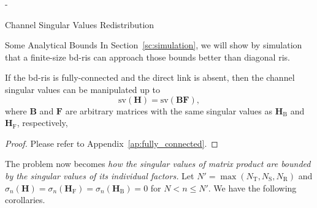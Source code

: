 \begin{section}{-}
\begin{subsection}{Channel Singular Values Redistribution}
\begin{subsubsection}{Some Analytical Bounds}
			In Section~\ref{sc:simulation}, we will show by simulation that a finite-size \gls{bd}-\gls{ris} can approach those bounds better than diagonal \gls{ris}.

			\begin{proposition}\label{pp:fully_connected}
				If the \gls{bd}-\gls{ris} is fully-connected and the direct link is absent, then the channel singular values can be manipulated up to
				\begin{equation}
					\mathrm{sv}(\mathbf{H}) = \mathrm{sv}(\mathbf{BF}),
				\end{equation}
				where $\mathbf{B}$ and $\mathbf{F}$ are arbitrary matrices with the same singular values as $\mathbf{H}_\mathrm{B}$ and $\mathbf{H}_\mathrm{F}$, respectively,
			\end{proposition}

			\begin{proof}
				Please refer to Appendix~\ref{ap:fully_connected}.
			\end{proof}

			The problem now becomes \emph{how the singular values of matrix product are bounded by the singular values of its individual factors.}
			Let $N' = \max(N_\mathrm{T},N_\mathrm{S},N_\mathrm{R})$ and $\sigma_n(\mathbf{H})=\sigma_n(\mathbf{H}_\mathrm{F})=\sigma_n(\mathbf{H}_\mathrm{B})=0$ for $N < n \le N'$.
			We have the following corollaries.


\end{subsubsection}
\end{subsection}
\end{section}
